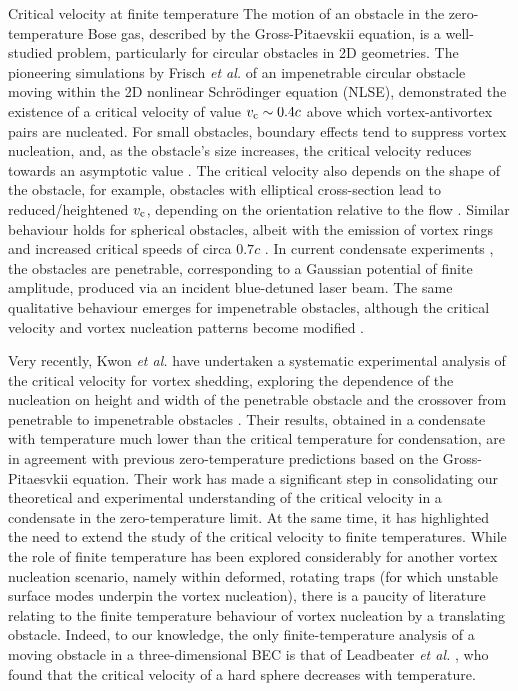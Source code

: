 \begin{chapter}{\label{cha:nonequib}Critical velocity at finite temperature}
The motion of an obstacle in the zero-temperature Bose gas, described by the Gross-Pitaevskii equation, is a well-studied problem, particularly for circular obstacles in 2D geometries.  The pioneering simulations by Frisch {\it et al.} \cite{frisch92} of an impenetrable circular obstacle moving within the 2D nonlinear Schr\"odinger equation (NLSE), demonstrated the existence of a critical velocity of value
$v_{\rm c}\sim 0.4c$ above which vortex-antivortex pairs are nucleated.
For small obstacles, boundary effects tend to suppress vortex nucleation,
and, as the obstacle's size increases, the critical velocity reduces towards an asymptotic value \cite{berloff2000,rica2001,pham2004}.  The critical velocity also depends on the shape of the obstacle, for example, obstacles with elliptical cross-section lead to reduced/heightened $v_{\rm c}$, depending on the orientation relative to the flow \cite{stagg_parker_14, stagg_2015b}. Similar behaviour holds for spherical obstacles, albeit with the emission of vortex rings and increased critical speeds of circa $0.7 c$ \cite{winiecki_2000,win01,stagg_parker_14}.
In current condensate experiments \cite{Neely,kwon_moon_14,Raman,Onofrio,Inouye,desbuquois_2012, kwon_2015a,kwon_2015b}, the obstacles are penetrable, corresponding to a Gaussian potential of finite amplitude, produced via an incident blue-detuned laser beam.
The same qualitative behaviour emerges for impenetrable obstacles,
although the critical velocity and vortex nucleation patterns become modified \cite{saito10}.

Very recently, Kwon {\it et al.} have undertaken
a systematic experimental analysis of the critical velocity for vortex
shedding, exploring the dependence of the nucleation
on height and width of the penetrable obstacle and the crossover
from penetrable to impenetrable obstacles \cite{kwon_2015a}.
Their results, obtained in a condensate with temperature much lower than
the critical temperature for condensation, are
in agreement with previous zero-temperature predictions based on the
Gross-Pitaesvkii equation.
Their work has made a significant step in consolidating our
theoretical and experimental understanding of the critical velocity
in a condensate in the zero-temperature limit.  At the same time,
it has highlighted the need to extend the study
of the critical velocity to finite temperatures.
While the role of finite temperature has been explored considerably for another vortex nucleation scenario, namely within deformed, rotating traps \cite{hodby_2002,abo_shaeer_2002,williams_2002,penckwitt_2002,kasamatsu_2003,lobo_2004} (for which unstable surface modes underpin the vortex nucleation), there is a paucity of literature relating to the finite temperature behaviour of vortex nucleation by a translating obstacle.  Indeed, to our knowledge, the only finite-temperature analysis of a moving obstacle in a three-dimensional BEC is that of Leadbeater {\it et al.}
\cite{leadbeater_2003}, who found that the critical velocity of a hard sphere decreases with temperature.


\end{chapter}
